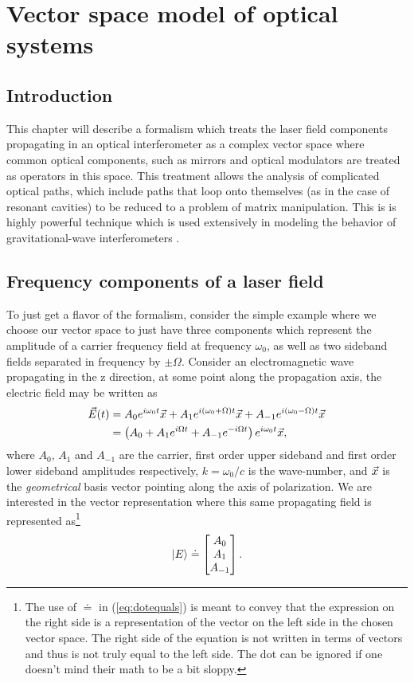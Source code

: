

\chapter{Vector space model of optical systems}

\section{Introduction}
This chapter will describe a formalism which treats the laser field components propagating in an optical interferometer as a complex vector space where common optical components, such as mirrors and optical modulators are treated as operators in this space. %
This treatment allows the analysis of complicated optical paths, which include paths that loop onto themselves (as in the case of resonant cavities) to be reduced to a problem of matrix manipulation. %
This is is highly powerful technique which is used extensively in modeling the behavior of gravitational-wave interferometers \cite{Vinet1986,Hefetz:97,Sigg:00}.

\section{Frequency components of a laser field}
\label{sec:freqspace}
To just get a flavor of the formalism, consider the simple example where we choose our vector space to just have three components which represent the amplitude of a carrier frequency field at frequency $\omega_0$, as well as two sideband fields separated in frequency by $\pm\Omega$. %
Consider an electromagnetic wave propagating in the z direction, at some point along the propagation axis, the electric field may be written as
\begin{align*}
\vec{E}(t) &= A_0 e^{i\omega_0t}\vec{x} + A_1e^{i(\omega_0+\Omega)t}\vec{x} + A_{-1}e^{i(\omega_0-\Omega)t}\vec{x}\\
&= \left( A_0 + A_1 e^{i\Omega t}+A_{-1}e^{-i\Omega t}\right) e^{i\omega_0 t}\vec{x},
\end{align*}
where $A_0$, $A_1$ and $A_{-1}$ are the carrier, first order upper sideband and first order lower sideband amplitudes respectively, $k=\omega_0/c$ is the wave-number, and $\vec{x}$ is the \emph{geometrical} basis vector pointing along the axis of polarization. %
We are interested in the vector representation where this same propagating field is represented as\footnote{The use of $\doteq$ in (\ref{eq:dotequals}) is meant to convey that the expression on the right side is a representation of the vector on the left side in the chosen vector space. %
The right side of the equation is not written in terms of vectors and thus is not truly equal to the left side. %
The dot can be ignored if one doesn't mind their math to be a bit sloppy.} 
\begin{equation}
\label{eq:dotequals}
\left| E \right> \doteq \left[\begin{matrix} A_0 \\ A_1 \\ A_{-1} \end{matrix}\right].
\end{equation}

